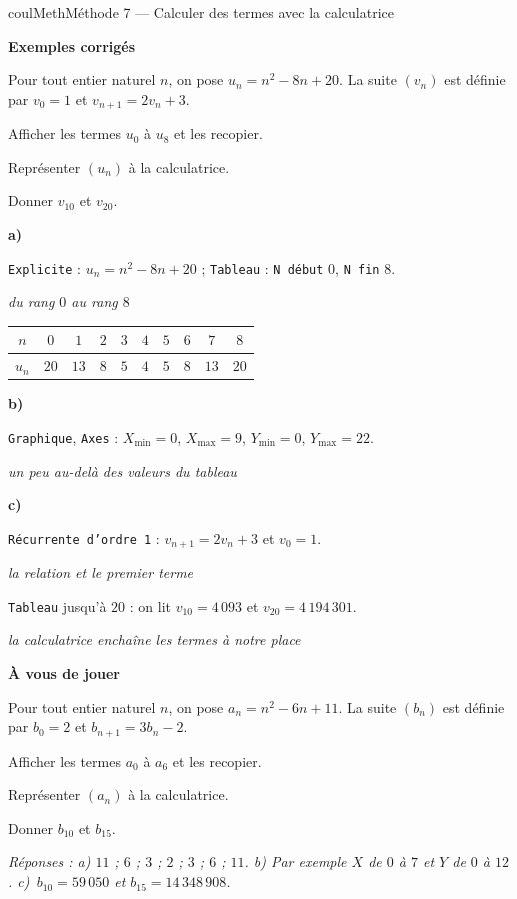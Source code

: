 \documentclass[11pt,a4paper]{article}
\makeatletter
\newcounter{lycee@signet}
\newcommand{\signet}[3][]{\stepcounter{lycee@signet}%
  \edef\lycee@dest{\if\relax\detokenize{#1}\relax
    signet.\arabic{lycee@signet}\else#1\fi}%
  \hypertarget{\lycee@dest}{}\bookmark[level=#2,dest=\lycee@dest]{#3}}
\newcommand{\res}[1]{#1}
\newcounter{methode}
\newenvironment{methodebox}[1][Méthode]{\stepcounter{methode}%
  \begin{boitecours}[phantom={\signet[methode-\arabic{methode}]{2}{#1}}]{coulMeth}{#1}}%
  {\end{boitecours}}
\newcommand{\etape}[1]{\par\smallskip\textbf{\color{coulMeth}#1}\par\nobreak\smallskip}
\newcommand{\reponse}[1]{\par\smallskip
  {\footnotesize\itshape\color{black!55}Réponses : #1}}
\newcommand{\explique}[2]{\par\smallskip\noindent
  \begin{minipage}[t]{0.57\linewidth}\raggedright #1\end{minipage}\hfill
  \begin{minipage}[t]{0.40\linewidth}\raggedright\leavevmode
    {\small\itshape\color{black!60}#2}\end{minipage}\par}
\newcommand{\cas}[1]{\par\smallskip\noindent\textbf{\color{coulExo}#1}\vadjust{\nobreak}}
\newenvironment{correction}{\par}{\par}
\newcommand{\etapeexemples}{\etape{Exemples corrigés}}
\makeatother
\begin{document}
\begin{methodebox}[Méthode 7 --- Calculer des termes avec la calculatrice]
\etapeexemples
Pour tout entier naturel $n$, on pose $u_{n}=n^{2}-8n+20$. La suite $(v_{n})$ est
définie par $v_{0}=1$ et $v_{n+1}=2v_{n}+3$.
\begin{questions}[label=\alph*)]
  \item Afficher les termes $u_{0}$ à $u_{8}$ et les recopier.
  \item Représenter $(u_{n})$ à la calculatrice.
  \item Donner $v_{10}$ et $v_{20}$.
\end{questions}
\begin{correction}
\cas{a)}
\explique{\texttt{Explicite} : $u_{n}=n^{2}-8n+20$ ; \texttt{Tableau} : \texttt{N début}
$0$, \texttt{N fin} $8$.}{du rang $0$ au rang $8$}
\begin{center}
\renewcommand{\arraystretch}{1.3}
\begin{tabular}{|c|*{9}{c|}}
\hline
$n$ & $0$ & $1$ & $2$ & $3$ & $4$ & $5$ & $6$ & $7$ & $8$\\\hline
$u_{n}$ & $20$ & $13$ & $8$ & $5$ & $4$ & $5$ & $8$ & $13$ & $20$\\\hline
\end{tabular}
\end{center}
\cas{b)}
\explique{\texttt{Graphique}, \texttt{Axes} : $X_{\min}=0$, $X_{\max}=9$, $Y_{\min}=0$,
$Y_{\max}=22$.}{un peu au-delà des valeurs du tableau}
\cas{c)}
\explique{\texttt{Récurrente d'ordre 1} : $v_{n+1}=2v_{n}+3$ et $v_{0}=1$.}{la relation
et le premier terme}
\explique{\texttt{Tableau} jusqu'à $20$ : on lit $v_{10}=\res{4\,093}$ et
$v_{20}=\res{4\,194\,301}$.}{la calculatrice enchaîne les termes à notre place}
\end{correction}

\etape{À vous de jouer}
Pour tout entier naturel $n$, on pose $a_{n}=n^{2}-6n+11$. La suite $(b_{n})$ est
définie par $b_{0}=2$ et $b_{n+1}=3b_{n}-2$.
\begin{questions}[label=\alph*)]
  \item Afficher les termes $a_{0}$ à $a_{6}$ et les recopier.
  \item Représenter $(a_{n})$ à la calculatrice.
  \item Donner $b_{10}$ et $b_{15}$.
\end{questions}
\reponse{a) $11$ ; $6$ ; $3$ ; $2$ ; $3$ ; $6$ ; $11$.\; b) Par exemple $X$ de $0$ à
$7$ et $Y$ de $0$ à $12$.\; c)~$b_{10}=59\,050$ et $b_{15}=14\,348\,908$.}
\end{methodebox}
\end{document}
